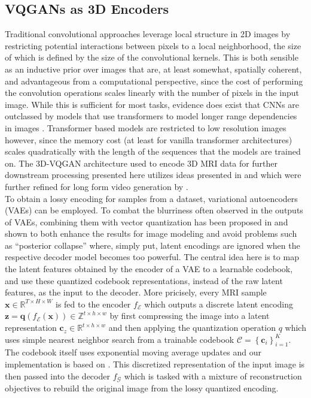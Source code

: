 \documentclass{article}
\begin{document}
\subsection{VQGANs as 3D Encoders}
Traditional convolutional approaches leverage local structure in 2D images by restricting potential interactions between pixels to a local neighborhood, the size of which is defined by the size of the convolutional kernels. This is both sensible as an inductive prior over images that are, at least somewhat, spatially coherent, and advantageous from a computational perspective, since the cost of performing the convolution operations scales linearly with the number of pixels in the input image. While this is sufficient for most tasks, evidence does exist that CNNs are outclassed by models that use transformers to model longer range dependencies in images \cite{parmar2018imagetransformer}. Transformer based models are restricted to low resolution images however, since the memory cost (at least for vanilla transformer architectures) scales quadratically with the length of the sequences that the models are trained on. The 3D-VQGAN architecture used to encode 3D MRI data for further downstream processing presented here utilizes ideas presented in \cite{esser2020taming} and \cite{yan2021videogpt} which were further refined for long form video generation by \cite{ge2022long}.\\
To obtain a lossy encoding for samples from a dataset, variational autoencoders (VAEs) can be employed. To combat the blurriness often observed in the outputs of VAEs, combining them with vector quantization has been proposed in \cite{oord2018neural} and shown to both enhance the results for image modeling and avoid problems such as ``posterior collapse'' where, simply put, latent encodings are ignored when the respective decoder model becomes too powerful. The central idea here is to map the latent features obtained by the encoder of a VAE to a learnable codebook, and use these quantized codebook representations, instead of the raw latent features, as the input to the decoder. More pricisely, every MRI sample $\mathbf{x} \in \mathbb{R}^{T \times H \times W}$ is fed to the encoder $f_{\mathcal{E}}$ which outputs a discrete latent encoding $\mathbf{z}=\mathbf{q}\left(f_{\mathcal{E}}(\mathbf{x})\right) \in \mathbb{Z}^{t \times h \times w}$ by first compressing the image into a latent representation $\mathbf{c}_z \in \mathbb{R}^{t \times h \times w}$ and then applying the quantization operation $q$ which uses simple nearest neighbor search from a trainable codebook $\mathcal{C}=\left\{\mathbf{c}_i\right\}_{i=1}^K$. The codebook itself uses exponential moving average updates and our implementation is based on \cite{ge2022long}. This discretized representation of the input image is then passed into the decoder $f_{\mathcal{G}}$ which is tasked with a mixture of reconstruction objectives to rebuild the original image from the lossy quantized encoding. 
\end{document}
